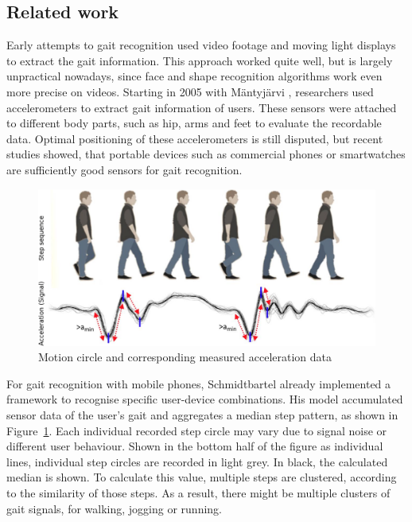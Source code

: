 \subsection{Related work}
Early attempts to gait recognition used video footage and moving light displays to extract the gait information. This approach worked quite well, but is largely unpractical nowadays, since face and shape recognition algorithms work even more precise on videos. Starting in 2005 with Mäntyjärvi \etal\cite{mantyjarvi2005identifying}, researchers used accelerometers to extract gait information of users. These sensors were attached to different body parts, such as hip, arms and feet to evaluate the recordable data. Optimal positioning of these accelerometers is still disputed, but recent studies showed, that portable devices such as commercial phones \cite{derawi2013gait} or smartwatches \cite{johnstonsmartwatch} are sufficiently good sensors for gait recognition.
\begin{figure}
    \centering
    \includegraphics[width=\textwidth]{figures/GaitAcceleration.png}
    \caption{Motion circle and corresponding measured acceleration data \cite{thesisschmidbartl}}
    \label{fig:gaitacceleration}
\end{figure}
For gait recognition with mobile phones, Schmidtbartel \cite{thesisschmidbartl} already implemented a framework to recognise specific user-device combinations. His model accumulated sensor data of the user's gait and aggregates a median step pattern, as shown in Figure~\ref{fig:gaitacceleration}. Each individual recorded step circle may vary due to signal noise or different user behaviour. Shown in the bottom half of the figure as individual lines, individual step circles are recorded in light grey. In black, the calculated median is shown. To calculate this value, multiple steps are clustered, according to the similarity of those steps. As a result, there might be multiple clusters of gait signals, \ie for walking, jogging or running.

